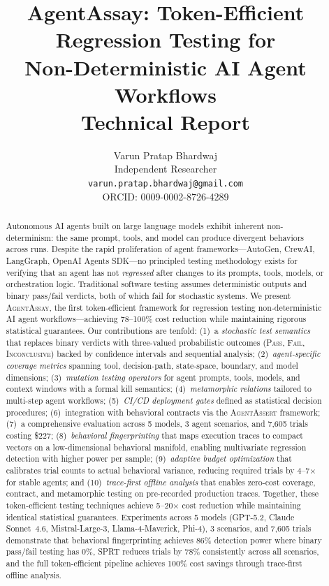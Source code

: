 \documentclass[11pt,a4paper]{article}
\title{%
  \textbf{AgentAssay: Token-Efficient Regression Testing for\\
  Non-Deterministic AI Agent Workflows}\\[6pt]
  \large Technical Report%
}
\author{%
  Varun Pratap Bhardwaj\\
  Independent Researcher\\
  \texttt{varun.pratap.bhardwaj@gmail.com}\\[2pt]
  \small ORCID: 0009-0002-8726-4289
}
\date{}
\theoremstyle{definition}
\theoremstyle{plain}
\theoremstyle{remark}
\newcommand{\agentassay}{\textsc{AgentAssay}}
\newcommand{\agentassert}{\textsc{AgentAssert}}
\newcommand{\PASS}{\textsc{Pass}}
\newcommand{\FAIL}{\textsc{Fail}}
\newcommand{\INCONC}{\textsc{Inconclusive}}
\begin{document}
\maketitle

\begin{abstract}
Autonomous AI agents built on large language models exhibit inherent
non-determinism: the same prompt, tools, and model can produce divergent
behaviors across runs. Despite the rapid proliferation of agent
frameworks---AutoGen, CrewAI, LangGraph, OpenAI Agents SDK---no
principled testing methodology exists for verifying that an agent has not
\emph{regressed} after changes to its prompts, tools, models, or
orchestration logic. Traditional software testing assumes deterministic
outputs and binary pass/fail verdicts, both of which fail for stochastic
systems. We present \agentassay{}, the first token-efficient framework
for regression testing non-deterministic AI agent workflows---achieving
78--100\% cost reduction while maintaining rigorous statistical
guarantees. Our contributions are tenfold:
(1)~a \emph{stochastic test semantics} that replaces binary verdicts with
three-valued probabilistic outcomes (\PASS{}, \FAIL{}, \INCONC{}) backed
by confidence intervals and sequential analysis;
(2)~\emph{agent-specific coverage metrics} spanning tool, decision-path,
state-space, boundary, and model dimensions;
(3)~\emph{mutation testing operators} for agent prompts, tools, models,
and context windows with a formal kill semantics;
(4)~\emph{metamorphic relations} tailored to multi-step agent workflows;
(5)~\emph{CI/CD deployment gates} defined as statistical decision procedures;
(6)~integration with behavioral contracts via the \agentassert{} framework;
(7)~a comprehensive evaluation across 5 models, 3 agent scenarios,
and 7{,}605 trials costing \$227;
(8)~\emph{behavioral fingerprinting} that maps execution traces to
compact vectors on a low-dimensional behavioral manifold, enabling
multivariate regression detection with higher power per sample;
(9)~\emph{adaptive budget optimization} that calibrates trial counts
to actual behavioral variance, reducing required trials by
4--7$\times$ for stable agents; and
(10)~\emph{trace-first offline analysis} that enables zero-cost
coverage, contract, and metamorphic testing on pre-recorded production
traces.
Together, these token-efficient testing techniques achieve
5--20$\times$ cost reduction while maintaining identical statistical
guarantees. Experiments across 5 models (GPT-5.2, Claude Sonnet~4.6,
Mistral-Large-3, Llama-4-Maverick, Phi-4), 3 scenarios, and 7{,}605
trials demonstrate that behavioral fingerprinting achieves 86\%
detection power where binary pass/fail testing has 0\%, SPRT reduces
trials by 78\% consistently across all scenarios, and the full
token-efficient pipeline achieves 100\% cost savings through
trace-first offline analysis.
\end{abstract}
\end{document}
